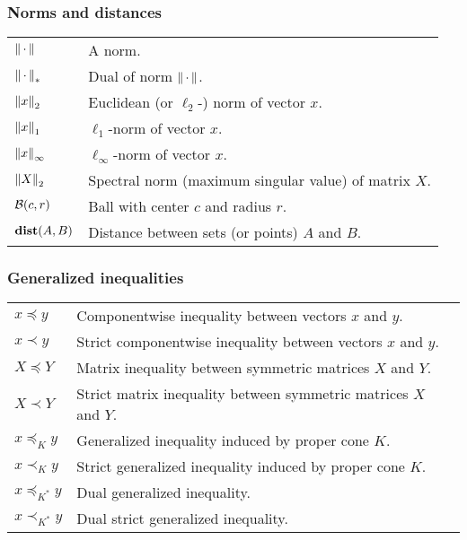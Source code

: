 \subsubsection*{Norms and distances}
\begin{longtable}{p{}p{}}
    ${\lVert \, \cdot\, \rVert}$ & A norm.\\
    ${\lVert \, \cdot\, \rVert}_*$ & Dual of norm ${\lVert \, \cdot\, \rVert}$.\\
    ${\lVert x \rVert}_2$ & Euclidean (or $\ell_2$-) norm of vector $x$.\\
    ${\lVert x \rVert}_1$ & $\ell_1$-norm of vector $x$.\\
    ${\lVert x \rVert}_\infty$ & $\ell_\infty$-norm of vector $x$.\\
    ${\lVert X \rVert}_2$ & Spectral norm (maximum singular value) of matrix $X$.\\
    ${\cal B{}}(c, r)$ & Ball with center $c$ and radius $r$.\\
    $\mathop{\bf dist}(A, B)$ & Distance between sets (or points) $A$ and $B$.\\
\end{longtable}

\subsubsection*{Generalized inequalities}
\begin{longtable}{p{}p{}}
    $x \preceq y$ & Componentwise inequality between vectors $x$ and $y$.\\
    $x \prec y$ & Strict componentwise inequality between vectors $x$ and $y$.\\
    $X \preceq Y$ & Matrix inequality between symmetric matrices $X$ and $Y$.\\
    $X \prec Y$ & Strict matrix inequality between symmetric matrices $X$ and $Y$.\\
    $x \preceq_K y$ & Generalized inequality induced by proper cone $K$.\\
    $x \prec_K y$ & Strict generalized inequality induced by proper cone $K$.\\
    $x \preceq_{K^*} y$ & Dual generalized inequality.\\
    $x \prec_{K^*} y$ & Dual strict generalized inequality.\\
\end{longtable}


